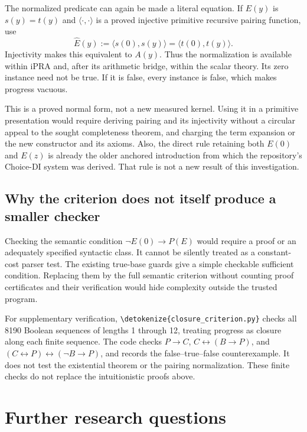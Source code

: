 \documentclass[11pt,letterpaper]{article}
\theoremstyle{definition}
\theoremstyle{remark}
\newcommand{\file}[1]{\expandafter\nolinkurl\expandafter{\detokenize{#1}}}
\begin{document}
The normalized predicate can again be made a literal equation. If
$E(y)$ is $s(y)=t(y)$ and $\langle\cdot,\cdot\rangle$ is a proved
injective primitive recursive pairing function, use
\[
 \widehat E(y):=
 \langle s(0),s(y)\rangle=\langle t(0),t(y)\rangle.
\]
Injectivity makes this equivalent to $A(y)$. Thus the normalization is
available within iPRA and, after its arithmetic bridge, within the scalar
theory. Its zero instance need not be true. If it is false, every instance
is false, which makes progress vacuous.

This is a proved normal form, not a new measured kernel. Using it in a
primitive presentation would require deriving pairing and its injectivity
without a circular appeal to the sought completeness theorem, and charging
the term expansion or the new constructor and its axioms. Also, the direct
rule retaining both $E(0)$ and $E(z)$ is already the older anchored
introduction from which the repository's Choice-DI system was derived.
That rule is not a new result of this investigation.

\subsection{Why the criterion does not itself produce a smaller checker}

Checking the semantic condition $\neg E(0)\to P(E)$ would require a proof
or an adequately specified syntactic class. It cannot be silently
treated as a constant-cost parser test. The existing true-base guards
give a simple checkable sufficient condition. Replacing them by the full
semantic criterion without counting proof certificates and their
verification would hide complexity outside the trusted program.

For supplementary verification, \file{closure_criterion.py} checks all
8190 Boolean sequences of lengths 1 through 12, treating progress as
closure along each finite sequence. The code checks $P\to C$,
$C\leftrightarrow(B\to P)$, and
$(C\leftrightarrow P)\leftrightarrow(\neg B\to P)$, and records the
false--true--false counterexample. It does not test the existential theorem
or the pairing normalization. These finite checks do not replace the
intuitionistic proofs above.

\section{Further research questions}
\end{document}
